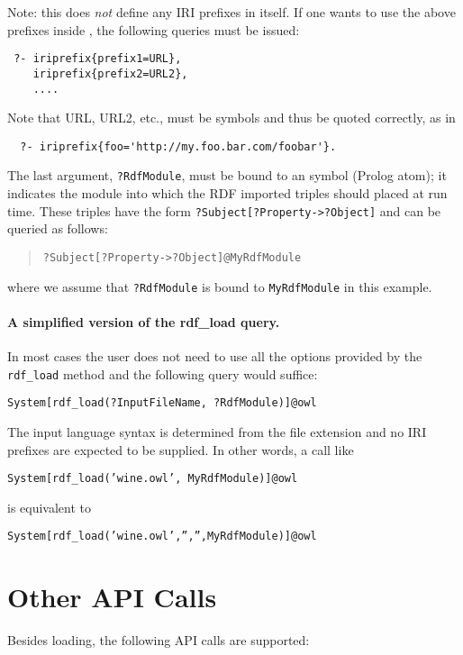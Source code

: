   Note: this does \emph{not} define any IRI prefixes in \ERGO itself.
  If one wants to use the above prefixes inside \ERGO, the following
  queries must be issued:
\begin{verbatim}
 ?- iriprefix{prefix1=URL},
    iriprefix{prefix2=URL2},
    ....
\end{verbatim}
  Note that URL, URL2, etc., must be symbols and thus be
  quoted correctly, as in
\begin{verbatim}
  ?- iriprefix{foo='http://my.foo.bar.com/foobar'}.  
\end{verbatim}

  The last argument,
  \texttt{?RdfModule}, must be bound to an \ERGO symbol (Prolog atom);
  it indicates the \ERGO module into which the RDF imported triples
  should placed at run time. These triples have the form
  \texttt{?Subject[?Property->?Object]} and can be queried as follows:
  \begin{quote}
    \texttt{?Subject[?Property->?Object]@MyRdfModule}  
  \end{quote}
  where we assume that \texttt{?RdfModule} is bound to
  \texttt{MyRdfModule} in this example. 
  

  \paragraph{A simplified version of the rdf\_load query.}
  In most cases the user does not need to use all the options
  provided by the \texttt{rdf\_load} method and the following query would
  suffice: 

  \texttt{System[rdf\_load(?InputFileName, ?RdfModule)]@\bs{}owl}

  The input language
  syntax is determined from the file extension and no IRI prefixes are
  expected to be supplied. In other words, a call like
  
  \texttt{System[rdf\_load('wine.owl', MyRdfModule)]@\bs{}owl}

  is equivalent to

  \texttt{System[rdf\_load('wine.owl','','',MyRdfModule)]@\bs{}owl}

\section{Other API Calls}

Besides loading, the following API calls are supported:

